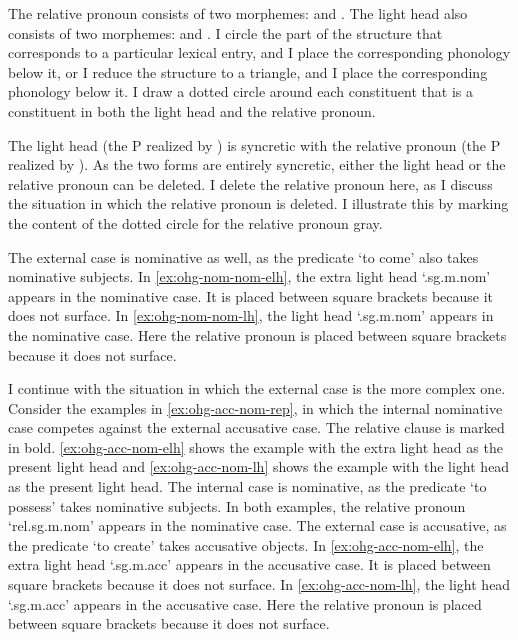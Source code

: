 The relative pronoun consists of two morphemes:  and .
The light head also consists of two morphemes:  and .
I circle the part of the structure that corresponds to a particular lexical entry, and I place the corresponding phonology below it, or I reduce the structure to a triangle, and I place the corresponding phonology below it.
I draw a dotted circle around each constituent that is a constituent in both the light head and the relative pronoun.

The light head (the P realized by ) is syncretic with the relative pronoun (the P realized by ).
As the two forms are entirely syncretic, either the light head or the relative pronoun can be deleted. I delete the relative pronoun here, as I discuss the situation in which the relative pronoun is deleted.
I illustrate this by marking the content of the dotted circle for the relative pronoun gray.


The external case is nominative as well, as the predicate  `to come' also takes nominative subjects.
In \ref{ex:ohg-nom-nom-elh}, the extra light head  `.\ac{sg}.\ac{m}.\ac{nom}' appears in the nominative case. It is placed between square brackets because it does not surface.
In \ref{ex:ohg-nom-nom-lh}, the light head  `.\ac{sg}.\ac{m}.\ac{nom}' appears in the nominative case. Here the relative pronoun is placed between square brackets because it does not surface.

I continue with the situation in which the external case is the more complex one.
Consider the examples in \ref{ex:ohg-acc-nom-rep}, in which the internal nominative case competes against the external accusative case. The relative clause is marked in bold. \ref{ex:ohg-acc-nom-elh} shows the example with the extra light head as the present light head and \ref{ex:ohg-acc-nom-lh} shows the example with the light head as the present light head.
The internal case is nominative, as the predicate  `to possess' takes nominative subjects.
In both examples, the relative pronoun  `\ac{rel}.\ac{sg}.\ac{m}.\ac{nom}' appears in the nominative case.
The external case is accusative, as the predicate  `to create' takes accusative objects.
In \ref{ex:ohg-acc-nom-elh}, the extra light head  `.\ac{sg}.\ac{m}.\ac{acc}' appears in the accusative case. It is placed between square brackets because it does not surface.
In \ref{ex:ohg-acc-nom-lh}, the light head  `.\ac{sg}.\ac{m}.\ac{acc}' appears in the accusative case. Here the relative pronoun is placed between square brackets because it does not surface.

